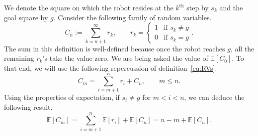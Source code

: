 \noindent We denote the square on which the robot resides at the $k^{\text{th}}$ step by
$s_k$ and the goal square by $g$. Consider the following family of random
variables.
\begin{equation}
    C_n := \sum_{k=n+1}^\infty r_k, \qquad r_k = 
\begin{cases}
    1 & \mbox{if } s_k \neq g \\
    0 & \mbox{if } s_k = g
\end{cases}.
\label{eq:RVs}
\end{equation}
The sum in this definition is well-defined because once the robot reaches $g$,
all the remaining $r_k$'s take the value zero. We are being asked the value of
$\mathbb{E}[C_0]$. To that end, we will use the following repercussion of
definition~\eqref{eq:RVs}.
\begin{equation*} 
    C_m = \sum_{i=m+1}^n r_i + C_n, \qquad m \leq n.
\end{equation*}
Using the properties of expectation, if $s_i \neq g$ for $m < i < n$, we can
deduce the following result.
\begin{equation*} 
    \mathbb{E}[C_m] = \sum_{i=m+1}^n \mathbb{E}[r_i] + \mathbb{E}[C_n] = n-m + \mathbb{E}[C_n].
\end{equation*}
